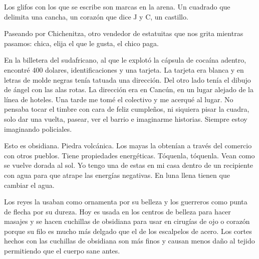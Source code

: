 \documentclass[12pt,twoside,openright,a5paper]{book}
\begin{document}
Los glifos con los que se escribe son marcas en la arena. Un cuadrado que
delimita una cancha, un corazón que dice J y C, un castillo.


\vspace{0.5cm}
\hrulefill\hspace{0.2cm} \decofourleft\decofourright \hspace{0.2cm} \hrulefill
\vspace{0.5cm}

Paseando por Chichenitza, otro vendedor de estatuitas que nos grita mientras
pasamos: chica, elija el que le gusta, el chico paga.


\vspace{0.5cm}
\hrulefill\hspace{0.2cm} \decofourleft\decofourright \hspace{0.2cm} \hrulefill
\vspace{0.5cm}

En la billetera del sudafricano, al que le explotó la cápsula
de cocaína adentro, encontré 400 dolares, identificaciones y una
tarjeta. La tarjeta era blanca y en letras de molde negras tenía tatuada
una dirección. Del otro lado tenía el dibujo de ángel con las alas
rotas. La dirección era en Cancún, en un lugar alejado de la línea de
hoteles. Una tarde me tomé el colectivo y me acerqué al lugar. No pensaba
tocar el timbre con cara de feliz cumpleños, ni siquiera pisar la cuadra,
solo dar una vuelta, pasear, ver el barrio e imaginarme historias. Siempre
estoy imaginando policiales.


\vspace{0.5cm}
\hrulefill\hspace{0.2cm} \decofourleft\decofourright \hspace{0.2cm} \hrulefill
\vspace{0.5cm}

Esto es obsidiana. Piedra volcánica. Los mayas la obtenían a través
del comercio con otros pueblos. Tiene propiedades energéticas. Tóquenla,
tóquenla. Vean como se vuelve dorada al sol. Yo tengo una de estas en
mi casa dentro de un recipiente con agua para que atrape las energías
negativas. En luna llena tienen que cambiar el agua.

Los reyes la usaban como ornamenta por su belleza y los guerreros como punta
de flecha por su dureza. Hoy es usada en los centros de belleza para hacer
masajes y se hacen cuchillas de obsidiana para usar en cirugías de ojo o
corazón porque su filo es mucho más delgado que el de los escalpelos de
acero. Los cortes hechos con las cuchillas de obsidiana son más finos y
causan menos daño al tejido permitiendo que el cuerpo sane antes.
\end{document}
